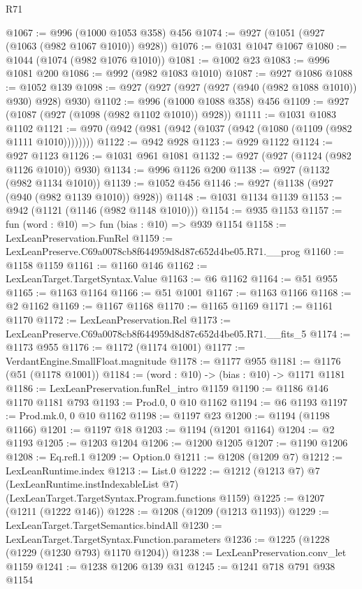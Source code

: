 \begin{lexlean}{R71}
\begin{coremodule}
@1067 := @996 (@1000 @1053 @358) @456
@1074 := @927 (@1051 (@927 (@1063 (@982 @1067 @1010)) @928))
@1076 := @1031 @1047 @1067
@1080 := @1044 (@1074 (@982 @1076 @1010))
@1081 := @1002 @23
@1083 := @996 @1081 @200
@1086 := @992 (@982 @1083 @1010)
@1087 := @927 @1086
@1088 := @1052 @139
@1098 := @927 (@927 (@927 (@927 (@940 (@982 @1088 @1010)) @930) @928) @930)
@1102 := @996 (@1000 @1088 @358) @456
@1109 := @927 (@1087 (@927 (@1098 (@982 @1102 @1010)) @928))
@1111 := @1031 @1083 @1102
@1121 := @970 (@942 (@981 (@942 (@1037 (@942 (@1080 (@1109 (@982 @1111 @1010))))))))
@1122 := @942 @928
@1123 := @929 @1122
@1124 := @927 @1123
@1126 := @1031 @961 @1081
@1132 := @927 (@927 (@1124 (@982 @1126 @1010)) @930)
@1134 := @996 @1126 @200
@1138 := @927 (@1132 (@982 @1134 @1010))
@1139 := @1052 @456
@1146 := @927 (@1138 (@927 (@940 (@982 @1139 @1010)) @928))
@1148 := @1031 @1134 @1139
@1153 := @942 (@1121 (@1146 (@982 @1148 @1010)))
@1154 := @935 @1153
@1157 := fun (word : @10) => fun (bias : @10) => @939 @1154
@1158 := LexLeanPreservation.FunRel
@1159 := LexLeanPreserve.C69a0078cb8f644959d8d87c652d4be05.R71.__prog
@1160 := @1158 @1159
@1161 := @1160 @146
@1162 := LexLeanTarget.TargetSyntax.Value
@1163 := @6 @1162
@1164 := @51 @955
@1165 := @1163 @1164
@1166 := @51 @1001
@1167 := @1163 @1166
@1168 := @2 @1162
@1169 := @1167 @1168
@1170 := @1165 @1169
@1171 := @1161 @1170
@1172 := LexLeanPreservation.Rel
@1173 := LexLeanPreserve.C69a0078cb8f644959d8d87c652d4be05.R71.__fits_5
@1174 := @1173 @955
@1176 := @1172 (@1174 @1001)
@1177 := VerdantEngine.SmallFloat.magnitude
@1178 := @1177 @955
@1181 := @1176 (@51 (@1178 @1001))
@1184 := (word : @10) -> (bias : @10) -> @1171 @1181
@1186 := LexLeanPreservation.funRel_intro @1159
@1190 := @1186 @146 @1170 @1181 @793
@1193 := Prod.{0, 0} @10 @1162
@1194 := @6 @1193
@1197 := Prod.mk.{0, 0} @10 @1162
@1198 := @1197 @23
@1200 := @1194 (@1198 @1166)
@1201 := @1197 @18
@1203 := @1194 (@1201 @1164)
@1204 := @2 @1193
@1205 := @1203 @1204
@1206 := @1200 @1205
@1207 := @1190 @1206
@1208 := Eq.refl.{1}
@1209 := Option.{0}
@1211 := @1208 (@1209 @7)
@1212 := LexLeanRuntime.index
@1213 := List.{0}
@1222 := @1212
    (@1213 @7)
    @7
    (LexLeanRuntime.instIndexableList @7)
    (LexLeanTarget.TargetSyntax.Program.functions @1159)
@1225 := @1207 (@1211 (@1222 @146))
@1228 := @1208 (@1209 (@1213 @1193))
@1229 := LexLeanTarget.TargetSemantics.bindAll
@1230 := LexLeanTarget.TargetSyntax.Function.parameters
@1236 := @1225 (@1228 (@1229 (@1230 @793) @1170 @1204))
@1238 := LexLeanPreservation.conv_let @1159
@1241 := @1238 @1206 @139 @31
@1245 := @1241 @718 @791 @938 @1154

\end{coremodule}
\end{lexlean}
